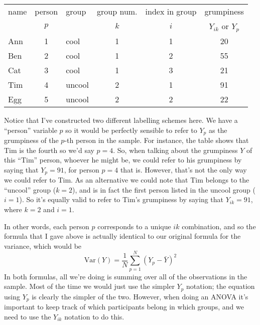 \bigskip
\begin{center}
\begin{tabular}{lclccc} \hline 
name & person & group & group num. & index in group & grumpiness \\
& $p$ &          & $k$ & $i$ & $Y_{ik}$ or $Y_p$ \\ \hline
Ann & 1 & cool   &  1  &  1  & 20 \\
Ben & 2 & cool   &  1  &  2  & 55\\
Cat & 3 & cool   &  1  &  3  & 21\\
Tim & 4 & uncool &  2  &  1  & 91\\
Egg & 5 & uncool &  2  &  2  & 22\\
\end{tabular}
\end{center}
Notice that I've constructed two different labelling schemes here. We have a ``person'' variable $p$ so it would be perfectly sensible to refer to $Y_p$ as the grumpiness of the $p$-th person in the sample. For instance, the table shows that Tim is the fourth so we'd say $p = 4$. So, when talking about the grumpiness $Y$ of this ``Tim'' person, whoever he might be, we could refer to his grumpiness by saying that $Y_p = 91$, for person $p = 4$ that is.  However, that's not the only way we could refer to Tim. As an alternative we could note that Tim belongs to the ``uncool'' group ($k = 2$), and is in fact the first person listed in the uncool group ($i = 1$). So it's equally valid to refer to Tim's grumpiness by saying that $Y_{ik} = 91$, where $k = 2$ and $i = 1$. 

\vspace{0.5cm}
\begin{mdframed}[style=MyFrame,nobreak=true]
In other words, each person $p$ corresponds to a unique $ik$ combination, and so the formula that I gave above is actually identical to our original formula for the variance, which would be
$$
\mbox{Var}(Y) = \frac{1}{N} \sum_{p=1}^N  \left(Y_{p} - \bar{Y} \right)^2
$$
In both formulas, all we're doing is summing over all of the observations in the sample. Most of the time we would just use the simpler $Y_p$ notation; the equation using $Y_p$ is clearly the simpler of the two. However, when doing an ANOVA it's important to keep track of which participants belong in which groups, and we need to use the $Y_{ik}$ notation to do this. 
\end{mdframed}


